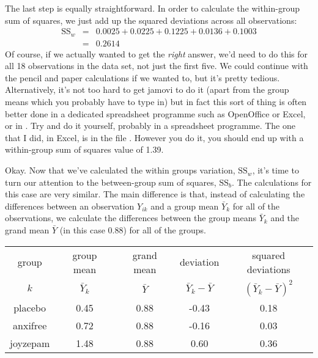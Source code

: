\noindent
The last step is equally straightforward. In order to calculate the within-group sum of squares, we just add up  the squared deviations across all observations:
$$
\begin{array}{rcl}
\mbox{SS}_w &=& 0.0025 + 0.0225 + 0.1225 + 0.0136 + 0.1003 \\
&=& 0.2614
\end{array}
$$
\noindent
Of course, if we actually wanted to get the {\it right} answer, we'd need to do this for all 18 observations in the data set, not just the first five. We could continue with the pencil and paper calculations if we wanted to, but it's pretty tedious. Alternatively, it's not too hard to get jamovi to do it (apart from the group means which you probably have to type in) but in fact this sort of thing is often better done in a dedicated spreadsheet programme such as OpenOffice or Excel, or in \R. Try and do it yourself, probably in a spreadsheet programme. The one that I did, in Excel, is in the file . However you do it, you should end up with a within-group sum of squares value of 1.39. 

Okay. Now that we've calculated the within groups variation, $\mbox{SS}_w$, it's time to turn our attention to the between-group sum of squares, $\mbox{SS}_b$. The calculations for this case are very similar. The main difference is that, instead of calculating the differences between an observation $Y_{ik}$ and a group mean $\bar{Y}_k$ for all of the observations, we calculate the differences between the group means $\bar{Y}_k$ and the grand mean $\bar{Y}$ (in this case 0.88) for all of the groups. 

\small
\vspace*{6pt}
\begin{tabular}{c|c|c|c|c}
 group & group mean  & grand mean & deviation               & squared deviations \\  
  $k$  & $\bar{Y}_k$ & $\bar{Y}$  & $\bar{Y}_{k} - \bar{Y}$ & $(\bar{Y}_{k} - \bar{Y})^2$ \\  \hline
placebo   & 0.45  &  0.88 &  -0.43 &  0.18 \\
anxifree  & 0.72  &  0.88 &  -0.16 &  0.03 \\
joyzepam  & 1.48  &  0.88 &  0.60  &  0.36 \\
\end{tabular}
\vspace*{6pt}
\normalsize

